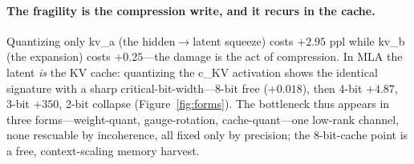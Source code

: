 \documentclass[10pt]{article}
\begin{document}
\paragraph{The fragility is the compression write, and it recurs in the cache.}
Quantizing only kv\_a (the hidden$\to$latent squeeze) costs $+2.95$ ppl while kv\_b (the expansion) costs
$+0.25$---the damage is the act of compression. In MLA the latent \emph{is} the KV cache: quantizing the
c\_KV activation shows the identical signature with a sharp critical-bit-width---8-bit free ($+0.018$), then
4-bit $+4.87$, 3-bit $+350$, 2-bit collapse (Figure~\ref{fig:forms}). The bottleneck thus appears in three
forms---weight-quant, gauge-rotation, cache-quant---one low-rank channel, none rescuable by incoherence,
all fixed only by precision; the 8-bit-cache point is a free, context-scaling memory harvest.
\end{document}
